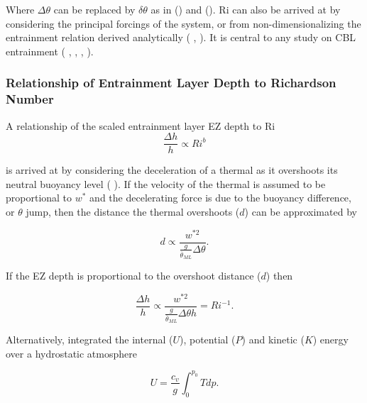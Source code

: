 Where $\Delta \theta$ can be replaced by $\delta \theta$ as in \citeauthor{FedConzMir04} (\citeyear{FedConzMir04}) and \citeauthor{GarciaMellado} (\citeyear{GarciaMellado}).  \acs{Ri} can also be arrived at by considering the principal forcings of the system, or from non-dimensionalizing the entrainment relation  derived analytically (\citeauthor{Tennekes73}  \citeyear{Tennekes73}, \citeauthor{Deardorff72} \citeyear{Deardorff72}). It is central to any study on \acs{CBL} entrainment (\citeauthor{SullMoengStev} \citeyear{SullMoengStev}, \citeauthor{FedConzMir04} \citeyear{FedConzMir04}, \citeauthor{Traum11} \citeyear{Traum11}, \citeauthor{BrooksFowler2} \citeyear{BrooksFowler2}).


\subsubsection{Relationship of Entrainment Layer Depth to Richardson Number}

A relationship of the scaled entrainment layer \acs{EZ} depth to \acs{Ri}
\begin{equation}\label{eq:dhvsri}
\frac{\Delta h}{h} \propto Ri ^{b}
\end{equation}

 is arrived at by considering the deceleration of a thermal
as it overshoots its neutral buoyancy level (\citeauthor{StullNelEl} \citeyear{StullNelEl}).  If the velocity of the thermal is assumed to be
proportional to $w^{*}$ and the decelerating force is due to the buoyancy difference, or $\theta$ jump, then the distance the thermal overshoots
($d$) can be approximated by

\begin{equation}
d \propto \frac{w^{*2}}{\frac{g}{\overline{\theta}_{ML}} \Delta \theta}. 
\end{equation} 

If the \acs{EZ} depth is proportional to the overshoot distance ($d$) then

\begin{equation}
\frac{\Delta h}{h} \propto \frac{w^{*2}}{\frac{g}{\overline{\theta}_{ML}} \Delta \theta h} = Ri^{-1}. 
\end{equation} 

Alternatively, \citeauthor{Boers89} \citeyear{Boers89} integrated the internal ($U$), potential ($P$) and kinetic ($K$) energy over a hydrostatic atmosphere

\begin{equation}
U = \frac{c_{v}}{g}\int^{p_{0}}_{0}Tdp.
\end{equation}

